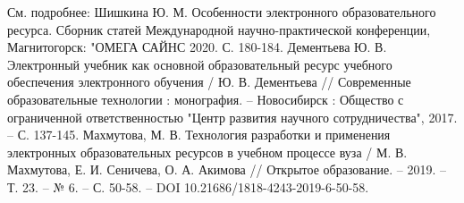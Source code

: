 \begin{thebibliography}{99}
  См. подробнее: Шишкина  Ю. М. Особенности электронного образовательного ресурса. Сборник статей Международной научно-практической конференции, Магнитогорск: "ОМЕГА САЙНС 2020. С. 180-184.
  Дементьева Ю. В. Электронный учебник как основной образовательный ресурс учебного обеспечения электронного обучения / Ю. В. Дементьева // Современные образовательные технологии : монография. – Новосибирск : Общество с ограниченной ответственностью "Центр развития научного сотрудничества", 2017. – С. 137-145.
  Махмутова, М. В. Технология разработки и применения электронных образовательных ресурсов в учебном процессе вуза / М. В. Махмутова, Е. И. Сеничева, О. А. Акимова // Открытое образование. – 2019. – Т. 23. – № 6. – С. 50-58. – DOI 10.21686/1818-4243-2019-6-50-58.
\end{thebibliography}
